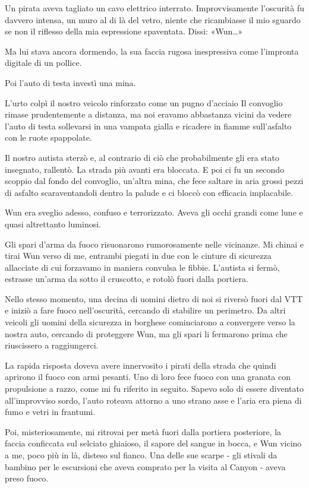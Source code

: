 Un pirata aveva tagliato un cavo elettrico interrato. Improvvisamente
l'oscurità fu davvero intensa, un muro al di là del vetro, niente che
ricambiasse il mio sguardo se non il riflesso della mia espressione
spaventata. Dissi: «Wun\ldots»

Ma lui stava ancora dormendo, la sua faccia rugosa inespressiva come
l'impronta digitale di un pollice.

Poi l'auto di testa investì una mina.

L'urto colpì il nostro veicolo rinforzato come un pugno d'acciaio Il
convoglio rimase prudentemente a distanza, ma noi eravamo abbastanza
vicini da vedere l'auto di testa sollevarsi in una vampata gialla e
ricadere in fiamme sull'asfalto con le ruote spappolate.

Il nostro autista sterzò e, al contrario di ciò che probabilmente gli
era stato insegnato, rallentò. La strada più avanti era bloccata. E poi
ci fu un secondo scoppio dal fondo del convoglio, un'altra mina, che
fece saltare in aria grossi pezzi di asfalto scaraventandoli dentro la
palude e ci bloccò con efficacia implacabile.

Wun era sveglio adesso, confuso e terrorizzato. Aveva gli occhi grandi
come lune e quasi altrettanto luminosi.

Gli spari d'arma da fuoco risuonarono rumorosamente nelle vicinanze. Mi
chinai e tirai Wun verso di me, entrambi piegati in due con le cinture
di sicurezza allacciate di cui forzavamo in maniera convulsa le fibbie.
L'autista si fermò, estrasse un'arma da sotto il cruscotto, e rotolò
fuori dalla portiera.

Nello stesso momento, una decina di uomini dietro di noi si riversò
fuori dal VTT e iniziò a fare fuoco nell'oscurità, cercando di stabilire
un perimetro. Da altri veicoli gli uomini della sicurezza in borghese
cominciarono a convergere verso la nostra auto, cercando di proteggere
Wun, ma gli spari li fermarono prima che riuscissero a raggiungerci.

La rapida risposta doveva avere innervosito i pirati della strada che
quindi aprirono il fuoco con armi pesanti. Uno di loro fece fuoco con
una granata con propulsione a razzo, come mi fu riferito in seguito.
Sapevo solo di essere diventato all'improvviso sordo, l'auto roteava
attorno a uno strano asse e l'aria era piena di fumo e vetri in
frantumi.

\separatorefiori

Poi, misteriosamente, mi ritrovai per metà fuori dalla portiera
posteriore, la faccia conficcata sul selciato ghiaioso, il sapore del
sangue in bocca, e Wun vicino a me, poco più in là, disteso sul fianco.
Una delle sue scarpe - gli stivali da bambino per le escursioni che
aveva comprato per la visita al Canyon - aveva preso fuoco.

